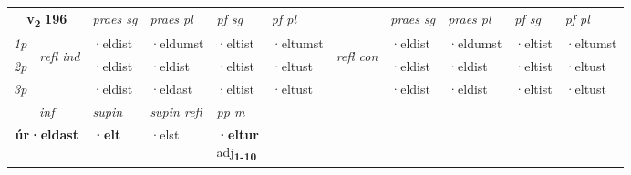 \noindent
\begin{tabular}{lllllllllll} \toprule
\multicolumn{2}{c}{\textbf{v{\textsubscript{2}}} \Large{\textbf{196}}}  &  \textit{praes sg}  & \textit{praes pl}  &\textit{ pf sg} & \textit{pf pl} &  &  \textit{praes sg}  & \textit{praes pl}  & \textit{pf sg} & \textit{pf pl } \\*
	\cmidrule{3-6} \cmidrule{8-11}
 {\textit{1p}} & \multirow{3}{*}{\begin{turn}{90}\textit{refl ind}\end{turn}}  & ·eldist & ·eldumst & ·eltist & ·eltumst & \multirow{3}{*}{\begin{turn}{90}\textit{refl con}\end{turn}}  &·eldist & ·eldumst & ·eltist & ·eltumst \\*
 {\textit{2p}} &  & ·eldist & ·eldist & ·eltist & ·eltust & &·eldist & ·eldist & ·eltist & ·eltust \\*
 {\textit{3p}}  & & ·eldist & ·eldast & ·eltist & ·eltust & & ·eldist & ·eldist& ·eltist & ·eltust \\*
\cmidrule{3-6} \cmidrule{8-11}

   \multicolumn{2}{c}{\textit{inf}}      & \textit{supin} & \textit{supin refl} & \textit{pp m} \\*
  \multicolumn{2}{c}{\textbf{úr\allowbreak ·eldast}}       &  \textbf{·elt} & ·elst & \specialcell{\textbf{·eltur} \\ adj\textbf{\textsubscript{1-10}}} \\*
\end{tabular}

